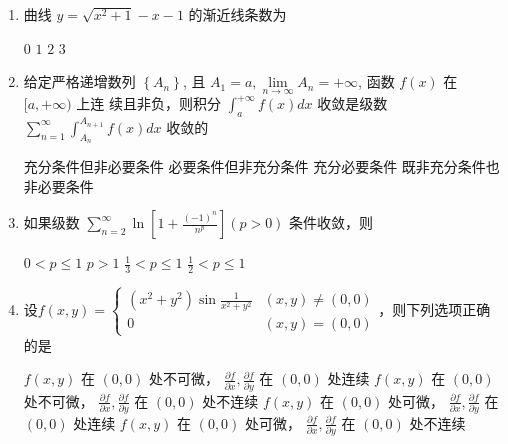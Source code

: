 \begin{enumerate}
\begin{enumerate}
	
\fourchoices
{$ 0 $}
{$\pi R^{4}$}
{$2 \pi R^{4}$}
{$4 \pi R^{4}$}

	
	
	\item
	曲线 $y=\sqrt{x^{2}+1}-x-1$ 的渐近线条数为  
	
	
\fourchoices
{$ 0 $}
{$ 1 $}
{$ 2 $}
{$ 3 $}


\item 
给定严格递增数列 $\left\{A_{n}\right\}$, 且 $A_{1}=a, \lim\limits _{n \rightarrow \infty} A_{n}=+\infty$, 函数 $f(x)$ 在 $[a,+\infty)$ 上连
续且非负，则积分 $\int_{a}^{+\infty} f(x) d x$ 收敛是级数 $\sum\limits_{n=1}^{\infty} \int_{A_{n}}^{A_{n+1}} f(x) d x$ 收敛的 



\fourchoices
{充分条件但非必要条件}
{必要条件但非充分条件}
{充分必要条件}
{既非充分条件也非必要条件}

\item 
如果级数 $\sum\limits_{n=2}^{\infty} \ln \left[1+\frac{(-1)^{n}}{n^{p}}\right](p>0)$ 条件收敛，则  


\fourchoices
{$0<p \leqslant 1$}
{$p>1$}
{$\frac{1}{3}<p \leqslant 1$}
{$\frac{1}{2}<p \leqslant 1$}


\item 
设$f(x, y)=\left\{\begin{array}{ll}\left(x^{2}+y^{2}\right) \sin \frac{1}{x^{2}+y^{2}} & (x, y) \neq(0,0) \\ 0 & (x, y)=(0,0)\end{array}\right.$，则下列选项正确的是  

\fourchoices
{$f(x, y)$ 在 $(0,0)$ 处不可微， $\frac{\partial f}{\partial x}, \frac{\partial f}{\partial y}$ 在 $(0,0)$ 处连续}
{$f(x, y)$ 在 $(0,0)$ 处不可微， $\frac{\partial f}{\partial x}, \frac{\partial f}{\partial y}$ 在 $(0,0)$ 处不连续}
{$f(x, y)$ 在 $(0,0)$ 处可微， $\frac{\partial f}{\partial x}, \frac{\partial f}{\partial y}$ 在 $(0,0)$ 处连续}
{$f(x, y)$ 在 $(0,0)$ 处可微， $\frac{\partial f}{\partial x}, \frac{\partial f}{\partial y}$ 在 $(0,0)$ 处不连续}

	
	
\end{enumerate}


\end{enumerate}
